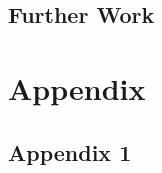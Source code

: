 \documentclass{article}
\begin{document}
\subsection{Further Work}

 
\section{Appendix}

\subsection{Appendix 1} %
%











     
\end{document}
